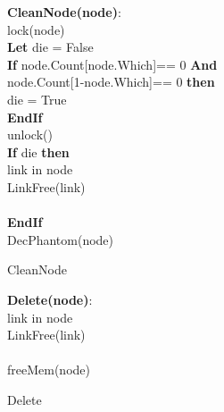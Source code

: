\begin{algorithm}[ht]
{\small
{\bf  CleanNode(node)}:\\
{\Indp
 {lock(node)}\\
{\bf Let} die = False\\
{\bf If} node.Count[node.Which]== 0 {\bf And}\\
\quad \quad node.Count[1-node.Which]== 0 {\bf then}\\
\quad  die = True\\
{\bf EndIf}\\
{unlock()}\\
{\bf If} die {\bf then}\\
 link in node\\
\quad \quad LinkFree(link)\\
\\
{\bf EndIf}\\
DecPhantom(node)\\
 }
}
\caption{CleanNode}
\label{algorithm:cleanup}
\end{algorithm}
\setlength{\textfloatsep}{0pt}
\begin{algorithm}[ht]
{\small
{\bf  Delete(node)}:\\
{\Indp
{} link in node \\
\quad \quad LinkFree(link)\\
\\
\quad freeMem(node)\\

 }
}
\caption{Delete}
\label{algorithm:Delete}
\end{algorithm}
\setlength{\textfloatsep}{0pt}

